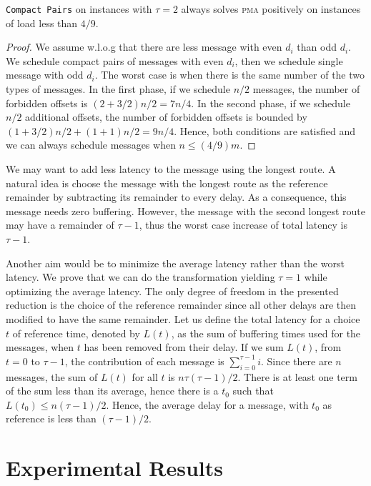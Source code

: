 \documentclass[a4paper,cleveref, autoref, thm-restate,UKenglish]{lipics-v2019}
\newcommand\pma{\textsc{pma}\xspace}
\newcommand\compactpair{\texttt{Compact Pairs}\xspace}
\begin{document}
\begin{theorem}
\compactpair on instances with $\tau =2$ always solves \pma positively on instances of load less than $4/9$.
\end{theorem}
\begin{proof}
We assume w.l.o.g that there are less message with even $d_i$ than odd $d_i$.
We schedule compact pairs of messages with even $d_i$, then we schedule single message with odd $d_i$. The worst case is when there is the same number of the two types of messages. In the first phase, if we schedule
 $n/2$ messages, the number of forbidden offsets is $(2 + 3/2)n/2 = 7n/4$. In the second phase,
 if we schedule $n/2$ additional offsets, the number of forbidden offsets is bounded by 
$ (1 + 3/2) n/2  + (1 + 1)n/2 = 9n/4$. 
Hence, both conditions are satisfied and we can always schedule messages when $n \leq (4/9)m$.
\end{proof}



We may want to add less latency to the message using the longest route. A natural idea is choose the message with the longest route as the reference remainder by subtracting its remainder to every delay.
As a consequence, this message needs zero buffering. However, the message with the second longest route may have a remainder of $\tau -1$, thus the worst case increase of total latency is $\tau -1$. 

Another aim would be to minimize the average latency rather than the worst latency.
We prove that we can do the transformation yielding $\tau=1$ while optimizing the average latency. 
 The only degree of freedom in the presented reduction is the choice of the reference remainder since all other delays are then modified to have the same remainder. Let us define the total latency for a choice $t$ of reference time, denoted by $L(t)$, as the sum of buffering times used for the messages, when $t$ has been removed from their delay.
If we sum $L(t)$, from $t=0$ to $\tau-1$, the contribution of each message is $\sum_{i=0}^{\tau-1} i$. Since there are $n$ messages, the sum of $L(t)$ for all $t$ is $n \tau (\tau-1)/2$. There is at least one term of the sum less than its average,
hence there is a $t_0$ such that $L(t_0) \leq n (\tau-1)/2$. Hence, the average delay for a message, with $t_0$ as reference is less than $(\tau -1)/2$.

\section{Experimental Results}
\end{document}
